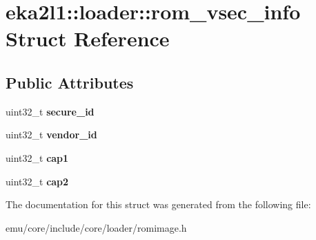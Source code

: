 \hypertarget{structeka2l1_1_1loader_1_1rom__vsec__info}{}\section{eka2l1\+:\+:loader\+:\+:rom\+\_\+vsec\+\_\+info Struct Reference}
\label{structeka2l1_1_1loader_1_1rom__vsec__info}
\subsection*{Public Attributes}
\begin{DoxyCompactItemize}
\item 
\mbox{\label{structeka2l1_1_1loader_1_1rom__vsec__info_aa0d15c461d6162a118fd0cc67eb24a73}} 
uint32\+\_\+t {\bfseries secure\+\_\+id}
\item 
\mbox{\label{structeka2l1_1_1loader_1_1rom__vsec__info_a7c58d17841a7d7a750baa48df23c5af8}} 
uint32\+\_\+t {\bfseries vendor\+\_\+id}
\item 
\mbox{\label{structeka2l1_1_1loader_1_1rom__vsec__info_aa82af8a62f74ce124ff4cdcf603e4111}} 
uint32\+\_\+t {\bfseries cap1}
\item 
\mbox{\label{structeka2l1_1_1loader_1_1rom__vsec__info_a8c10634033388c9b9f84a837adcbe474}} 
uint32\+\_\+t {\bfseries cap2}
\end{DoxyCompactItemize}


The documentation for this struct was generated from the following file\+:\begin{DoxyCompactItemize}
\item 
emu/core/include/core/loader/romimage.\+h\end{DoxyCompactItemize}
